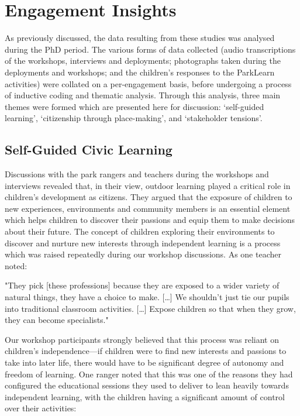 \section{Engagement Insights}
\label{sec:InfrastructureInsights}
As previously discussed, the data resulting from these studies was analysed during the PhD period. The various forms of data collected (audio transcriptions of the workshops, interviews and deployments; photographs taken during the deployments and workshops; and the children's responses to the ParkLearn activities) were collated on a per-engagement basis, before undergoing a process of inductive coding and thematic analysis. Through this analysis, three main themes were formed which are presented here for discussion: `self-guided learning', `citizenship through place-making', and `stakeholder tensions'.

\subsection{Self-Guided Civic Learning}

Discussions with the park rangers and teachers during the workshops and interviews revealed that, in their view, outdoor learning played a critical role in children’s development as citizens. They argued that the exposure of children to new experiences, environments and community members is an essential element which helps children to discover their passions and equip them to make decisions about their future. The concept of children exploring their environments to discover and nurture new interests through independent learning is a process which was raised repeatedly during our workshop discussions. As one teacher noted:

\begin{displayquote}
"They pick [these professions] because they are exposed to a wider variety of natural things, they have a choice to make. […] We shouldn’t just tie our pupils into traditional classroom activities. […] Expose children so that when they grow, they can become specialists."
\end{displayquote}

Our workshop participants strongly believed that this process was reliant on children’s independence---if children were to find new interests and passions to take into later life, there would have to be significant degree of autonomy and freedom of learning. One ranger noted that this was one of the reasons they had configured the educational sessions they used to deliver to lean heavily towards independent learning, with the children having a significant amount of control over their activities:

